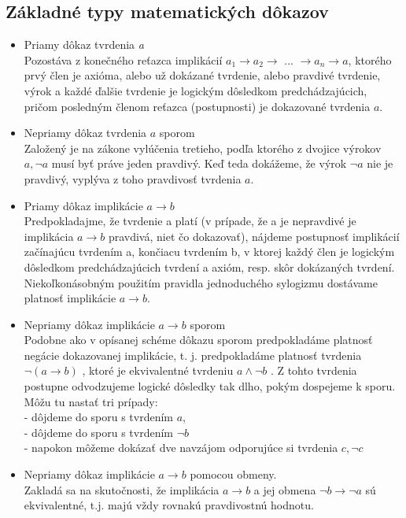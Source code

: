   \subsection*{Základné typy matematických dôkazov}
    \begin{itemize}
    \item Priamy dôkaz tvrdenia \textit{a}\\
      Pozostáva z konečného reťazca implikácií $ a_{1} \rightarrow a_{2} \rightarrow$ ... $\rightarrow a_{n} \rightarrow a $, ktorého prvý člen je axióma, alebo už dokázané tvrdenie, alebo pravdivé tvrdenie, výrok a každé ďalšie tvrdenie je logickým dôsledkom predchádzajúcich, pričom posledným členom reťazca (postupnosti) je dokazované tvrdenia $a$.
    \item Nepriamy dôkaz tvrdenia $a$ sporom\\
      Založený je na zákone vylúčenia tretieho, podľa ktorého z dvojice výrokov $a, \neg a$ musí byť práve jeden pravdivý. Keď teda dokážeme, že výrok $\neg a$ nie je pravdivý, vyplýva z toho pravdivosť tvrdenia $a$.
    \item Priamy dôkaz implikácie $ a \rightarrow b$\\
      Predpokladajme, že tvrdenie a platí (v prípade, že a je nepravdivé je implikácia $a \rightarrow b$ pravdivá, niet čo dokazovať), nájdeme postupnosť implikácií začínajúcu tvrdením a, končiacu tvrdením b, v ktorej každý člen je logickým dôsledkom predchádzajúcich tvrdení a axióm, resp. skôr dokázaných tvrdení. Niekoľkonásobným použitím pravidla jednoduchého sylogizmu dostávame platnosť implikácie $a \rightarrow b$.

    \item Nepriamy dôkaz implikácie $ a \rightarrow b$ sporom\\
      Podobne ako v opísanej schéme dôkazu sporom predpokladáme platnosť negácie dokazovanej implikácie, t. j. predpokladáme platnosť tvrdenia $\neg ( a \rightarrow b)$ , ktoré je ekvivalentné tvrdeniu $a \wedge \neg b$ . Z tohto tvrdenia postupne odvodzujeme logické dôsledky tak dlho, pokým dospejeme k sporu. Môžu tu nastať tri prípady:\\
      - dôjdeme do sporu s tvrdením $a$,\\
      - dôjdeme do sporu s tvrdením $\neg b$\\
      - napokon môžeme dokázať dve navzájom odporujúce si tvrdenia $c, \neg c$

    \item Nepriamy dôkaz implikácie $a \rightarrow b$ pomocou obmeny.\\
      Zakladá sa na skutočnosti, že implikácia $ a \rightarrow b$ a jej obmena $ \neg b \rightarrow \neg a $ sú ekvivalentné, t.j. majú vždy rovnakú pravdivostnú hodnotu.


\end{itemize}
